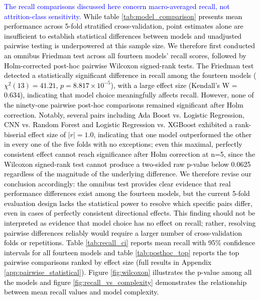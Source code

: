 \documentclass[a4paper,fleqn]{cas-sc}
\begin{document}
\textcolor{black}{\textcolor{blue}{The recall comparisons discussed here concern macro-averaged recall, not attrition-class sensitivity.} While table \ref{tab:model_comparison} presents mean performance across 5-fold stratified cross-validation, point estimates alone are insufficient to establish statistical differences between models and unadjusted pairwise testing is underpowered at this sample size. We therefore first conducted an omnibus Friedman test across all fourteen models' recall scores, followed by Holm-corrected post-hoc pairwise Wilcoxon signed-rank tests. The Friedman test detected a statistically significant difference in recall among the fourteen models ($\chi^2(13) = 41.21$, $p = 8.817\times10^{-5}$), with a large effect size (Kendall's W = 0.634), indicating that model choice meaningfully affects recall. However, none of the ninety-one pairwise post-hoc comparisons remained significant after Holm correction. Notably, several pairs including Ada Boost vs. Logistic Regression, CNN vs. Random Forest and Logistic Regression vs. XGBoost exhibited a rank-biserial effect size of $|r| = 1.0$, indicating that one model outperformed the other in every one of the five folds with no exceptions; even this maximal, perfectly consistent effect cannot reach significance after Holm correction at n=5, since the Wilcoxon signed-rank test cannot produce a two-sided raw p-value below 0.0625 regardless of the magnitude of the underlying difference. We therefore revise our conclusion accordingly: the omnibus test provides clear evidence that real performance differences exist among the fourteen models, but the current 5-fold evaluation design lacks the statistical power to resolve which specific pairs differ, even in cases of perfectly consistent directional effects. This finding should not be interpreted as evidence that model choice has no effect on recall; rather, resolving pairwise differences reliably would require a larger number of cross-validation folds or repetitions. Table \ref{tab:recall_ci} reports mean recall with 95\% confidence intervals for all fourteen models and table \ref{tab:posthoc_top} reports the top pairwise comparisons ranked by effect size (full results in Appendix \cref{app:pairwise_statistical}). Figure \ref{fig:wilcoxon} illustrates the p-value among all the models and figure \ref{fig:recall_vs_complexity} demonstrates the relationship between mean recall values and model complexity.}
\end{document}
